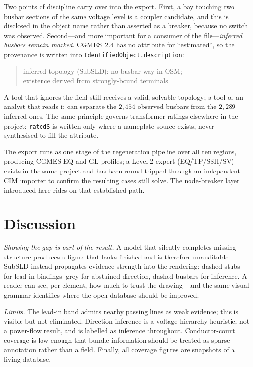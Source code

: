 \documentclass[journal]{IEEEtran}
\begin{document}
Two points of discipline carry over into the export. First, a bay touching two
busbar sections of the same voltage level is a coupler candidate, and this is
disclosed in the object name rather than asserted as a breaker, because no
switch was observed. Second---and more important for a consumer of the
file---\emph{inferred busbars remain marked}. CGMES~2.4 has no attribute for
``estimated'', so the provenance is written into
\texttt{IdentifiedObject.description}:

\begin{quote}\footnotesize\ttfamily
inferred-topology (SubSLD): no busbar way in OSM;\\
existence derived from strongly-bound terminals
\end{quote}

A tool that ignores the field still receives a valid, solvable topology; a tool
or an analyst that reads it can separate the $2{,}454$ observed busbars from the
$2{,}289$ inferred ones. The same principle governs transformer ratings
elsewhere in the project: \texttt{ratedS} is written only where a nameplate
source exists, never synthesised to fill the attribute.

The export runs as one stage of the regeneration pipeline over all ten regions,
producing CGMES EQ and GL profiles; a Level-2 export (EQ/TP/SSH/SV) exists in
the same project and has been round-tripped through an independent CIM importer
to confirm the resulting cases still solve. The node-breaker layer introduced
here rides on that established path.

\section{Discussion}\label{sec:discussion}

\emph{Showing the gap is part of the result.} A model that silently completes
missing structure produces a figure that looks finished and is therefore
unauditable. SubSLD instead propagates evidence strength into the rendering:
dashed stubs for lead-in bindings, grey for abstained direction, dashed busbars
for inference. A reader can see, per element, how much to trust the drawing---and
the same visual grammar identifies where the open database should be improved.

\emph{Limits.} The lead-in band admits nearby passing lines as weak evidence;
this is visible but not eliminated. Direction inference is a voltage-hierarchy
heuristic, not a power-flow result, and is labelled as inference throughout.
Conductor-count coverage is low enough that bundle information should be treated
as sparse annotation rather than a field. Finally, all coverage figures are
snapshots of a living database.
\end{document}
